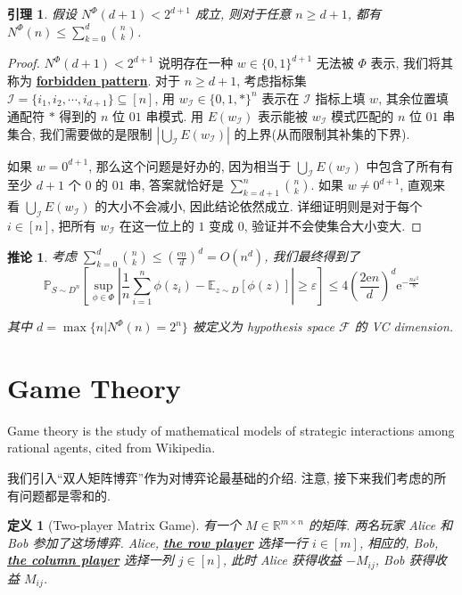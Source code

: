 \documentclass[8pt]{article}
\theoremstyle{compact}
\newtheorem{lemma}{引理}[section]
\newtheorem{definition}{定义}[section]
\newtheorem{corollary}{推论}[section]
\def\obj#1{\textbf{\uline{#1}}}
\def\le{\leqslant}
\def\ge{\geqslant}
\def\e{\mathrm{e}}
\begin{document}
\begin{lemma}
	假设 $N^{\Phi}(d + 1) < 2^{d+1}$ 成立, 则对于任意 $n \ge d + 1$, 都有 $N^{\Phi}(n) \le \sum\limits_{k=0}^{d}\binom nk$.
\end{lemma}
\begin{proof}
	$N^{\Phi}(d + 1) < 2^{d+1}$ 说明存在一种 $w \in \{0, 1\}^{d+1}$ 无法被 $\Phi$ 表示, 我们将其称为 \obj{forbidden pattern}. 对于 $n \ge d + 1$, 考虑指标集 $\mathcal I = \{i_1, i_2, \cdots, i_{d+1}\} \subseteq [n]$, 用 $w_{\mathcal I} \in \{0, 1, *\}^n$ 表示在 $\mathcal I$ 指标上填 $w$, 其余位置填通配符 $*$ 得到的 $n$ 位 $01$ 串模式. 用 $E(w_{\mathcal I})$ 表示能被 $w_{\mathcal I}$ 模式匹配的 $n$ 位 $01$ 串集合, 我们需要做的是限制 $\left|\bigcup_{\mathcal I}E(w_{\mathcal I})\right|$ 的上界(从而限制其补集的下界).

	如果 $w = 0^{d+1}$, 那么这个问题是好办的, 因为相当于 $\bigcup_{\mathcal I}E(w_{\mathcal I})$ 中包含了所有有至少 $d+1$ 个 $0$ 的 $01$ 串, 答案就恰好是 $\sum\limits_{k = d+1}^{n}\binom{n}{k}$. 如果 $w \neq 0^{d+1}$, 直观来看 $\bigcup_{\mathcal I}E(w_{\mathcal I})$ 的大小不会减小, 因此结论依然成立. 详细证明则是对于每个 $i \in [n]$, 把所有 $w_{\mathcal I}$ 在这一位上的 $1$ 变成 $0$, 验证并不会使集合大小变大.
\end{proof}
\begin{corollary}
	考虑 $\sum\limits_{k=0}^d \binom nk \le \left(\frac{\e n}{d}\right)^d = O(n^d)$, 我们最终得到了$$\mathbb P_{S \sim D^n}\left[\sup_{\phi \in \Phi}\left|\frac1n\sum_{i=1}^{n}\phi(z_i) - \mathbb E_{z \sim D}[\phi(z)]\right| \ge \varepsilon\right] \le 4\left(\frac{2\e n}{d}\right)^d\e^{-\frac{n\varepsilon^2}{8}}$$

	其中 $d = \max\{n | N^{\Phi}(n) = 2^n\}$ 被定义为 hypothesis space $\mathcal F$ 的 VC dimension.
\end{corollary}

\newpage
\section{Game Theory}

Game theory is the study of mathematical models of strategic interactions among rational agents, cited from Wikipedia.

我们引入“双人矩阵博弈”作为对博弈论最基础的介绍. 注意, 接下来我们考虑的所有问题都是零和的.

\begin{definition}[Two-player Matrix Game]
	有一个 $M \in \mathbb R^{m \times n}$ 的矩阵. 两名玩家 Alice 和 Bob 参加了这场博弈. Alice, \obj{the row player} 选择一行 $i \in [m]$, 相应的, Bob, \obj{the column player} 选择一列 $j \in [n]$, 此时 Alice 获得收益 $-M_{ij}$, Bob 获得收益 $M_{ij}$.
\end{definition}
\end{document}
